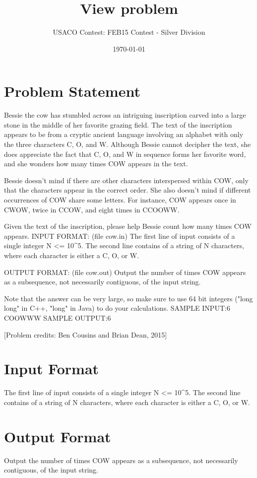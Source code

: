 \documentclass[12pt]{article}
\title{View problem}
\author{USACO Contest: FEB15 Contest - Silver Division}
\date{\today}
\begin{document}
\maketitle

\section*{Problem Statement}

Bessie the cow has stumbled across an intriguing inscription carved into a large stone in the middle of her favorite grazing field.  The text of the inscription appears to be from a cryptic ancient language involving an alphabet with only the three characters C, O, and W.  Although Bessie cannot decipher the text, she does appreciate the fact that C, O, and W in sequence forms her favorite word, and she wonders how many times COW appears in the text.

Bessie doesn't mind if there are other characters interspersed within COW, only that the characters appear in the correct order. She also doesn't mind if different occurrences of COW share some letters. For instance, COW appears once in CWOW, twice in CCOW, and eight times in CCOOWW. 

Given the text of the inscription, please help Bessie count how many times COW appears.
INPUT FORMAT: (file cow.in)
The first line of input consists of a single integer N <= 10^5.  The second line contains of a string of N characters, where each character is either a C, O, or W.

OUTPUT FORMAT: (file cow.out)
Output the number of times COW appears as a subsequence, not necessarily contiguous, of the input string. 


Note that the answer can be very large, so make sure to use 64 bit integers ("long long" in C++, "long" in Java) to do your calculations. 
SAMPLE INPUT:6
COOWWW
SAMPLE OUTPUT:6

[Problem credits: Ben Cousins and Brian Dean, 2015]



\section*{Input Format}
The first line of input consists of a single integer N <= 10^5.  The second line contains of a string of N characters, where each character is either a C, O, or W.

\section*{Output Format}
Output the number of times COW appears as a subsequence, not necessarily contiguous, of the input string.
\end{document}
